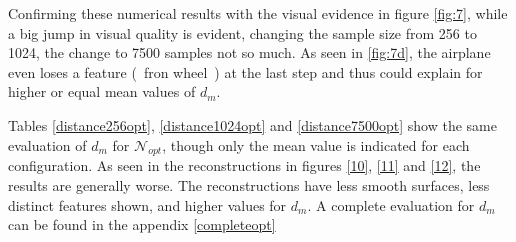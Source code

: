     Confirming these numerical results with the visual evidence in figure \ref{fig:7}, 
    while a big jump in visual quality is evident, changing the sample size from 256 to 1024, 
    the change to 7500 samples not so much. As seen in \ref{fig:7d}, the airplane even loses a 
    feature (~fron wheel~) at the last step and thus could explain for higher or equal mean values 
    of $d_m$.

    Tables \ref{distance256opt}, \ref{distance1024opt} and \ref{distance7500opt} show the same evaluation of $d_m$ for $\mathcal{N}_{opt}$, though only the mean value
    is indicated for each configuration. As seen in the reconstructions in figures \ref{10}, \ref{11} and \ref{12}, the results are generally worse. The reconstructions
    have less smooth surfaces, less distinct features shown, and higher values for $d_m$. A complete evaluation for $d_m$ can be found in the appendix \ref{completeopt}

